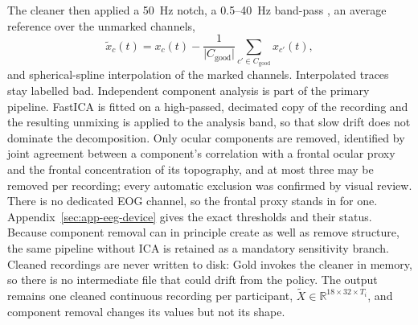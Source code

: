 \documentclass[english]{article}
\begin{document}
The cleaner then applied a 50~Hz notch, a 0.5--40~Hz band-pass \cite{lopezcardona2026vlfeedbackeeg}, an average reference over the unmarked channels,
\begin{equation}
\tilde{x}_{c}(t)
=
x_{c}(t)
-
\frac{1}{\lvert C_{\mathrm{good}}\rvert}
\sum_{c'\in C_{\mathrm{good}}} x_{c'}(t),
\end{equation}
and spherical-spline interpolation of the marked channels. Interpolated traces stay labelled bad. Independent component analysis is part of the primary pipeline. FastICA is fitted on a high-passed, decimated copy of the recording and the resulting unmixing is applied to the analysis band, so that slow drift does not dominate the decomposition. Only ocular components are removed, identified by joint agreement between a component's correlation with a frontal ocular proxy and the frontal concentration of its topography, and at most three may be removed per recording; every automatic exclusion was confirmed by visual review. There is no dedicated EOG channel, so the frontal proxy stands in for one. Appendix~\ref{sec:app-eeg-device} gives the exact thresholds and their status. Because component removal can in principle create as well as remove structure, the same pipeline without ICA is retained as a mandatory sensitivity branch. Cleaned recordings are never written to disk: Gold invokes the cleaner in memory, so there is no intermediate file that could drift from the policy. The output remains one cleaned continuous recording per participant, \(\tilde{X}\in\mathbb{R}^{18\times 32\times T_{i}}\), and component removal changes its values but not its shape.
\end{document}
